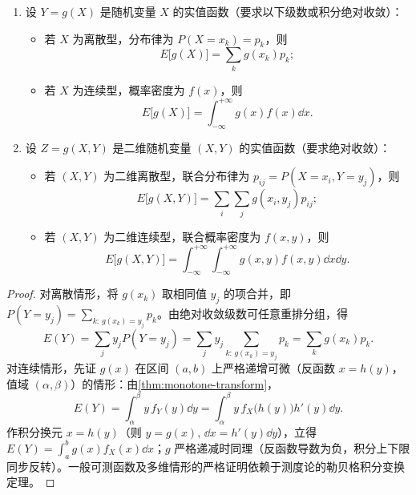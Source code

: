 \begin{theorem}[随机变量函数的数学期望]
\label{thm:function-expectation}
\begin{enumerate}
  \item 设 $Y=g(X)$ 是随机变量 $X$ 的实值函数（要求以下级数或积分绝对收敛）：
  \begin{itemize}
    \item 若 $X$ 为离散型，分布律为 $P(X=x_k)=p_k$，则
    \begin{equation}
      E\bigl[g(X)\bigr]=\sum_{k}g(x_k)p_k;
      \label{eq:func-exp-discrete}
    \end{equation}
    \item 若 $X$ 为连续型，概率密度为 $f(x)$，则
    \begin{equation}
      E\bigl[g(X)\bigr]=\int_{-\infty}^{+\infty}g(x)f(x)\dd x.
      \label{eq:func-exp-continuous}
    \end{equation}
  \end{itemize}
  \item 设 $Z=g(X,Y)$ 是二维随机变量 $(X,Y)$ 的实值函数（要求绝对收敛）：
  \begin{itemize}
    \item 若 $(X,Y)$ 为二维离散型，联合分布律为 $p_{ij}=P(X=x_i,Y=y_j)$，则
    \[
      E\bigl[g(X,Y)\bigr]=\sum_{i}\sum_{j}g(x_i,y_j)p_{ij};
    \]
    \item 若 $(X,Y)$ 为二维连续型，联合概率密度为 $f(x,y)$，则
    \begin{equation}
      E\bigl[g(X,Y)\bigr]=\int_{-\infty}^{+\infty}\int_{-\infty}^{+\infty}g(x,y)f(x,y)\dd x\dd y.
      \label{eq:func-exp-2d}
    \end{equation}
  \end{itemize}
\end{enumerate}
\end{theorem}
\begin{proof}
对离散情形，将 $g(x_k)$ 取相同值 $y_j$ 的项合并，即 $P(Y=y_j)=\sum_{k:\,g(x_k)=y_j}p_k$。由绝对收敛级数可任意重排分组，得
\[
  E(Y)=\sum_{j}y_j P(Y=y_j)=\sum_{j}y_j\sum_{k:\,g(x_k)=y_j}p_k=\sum_{k}g(x_k)p_k.
\]
对连续情形，先证 $g(x)$ 在区间 $(a,b)$ 上严格递增可微（反函数 $x=h(y)$，值域 $(\alpha,\beta)$）的情形：由\cref{thm:monotone-transform}，
\[
  E(Y)=\int_{\alpha}^{\beta}y\,f_Y(y)\dd y
  =\int_{\alpha}^{\beta}y\,f_X\bigl(h(y)\bigr)h'(y)\dd y.
\]
作积分换元 $x=h(y)$（则 $y=g(x),\,\dd x=h'(y)\dd y$），立得 $E(Y)=\int_{a}^{b}g(x)f_X(x)\dd x$；$g$ 严格递减时同理（反函数导数为负，积分上下限同步反转）。一般可测函数及多维情形的严格证明依赖于测度论的勒贝格积分变换定理。
\end{proof}

